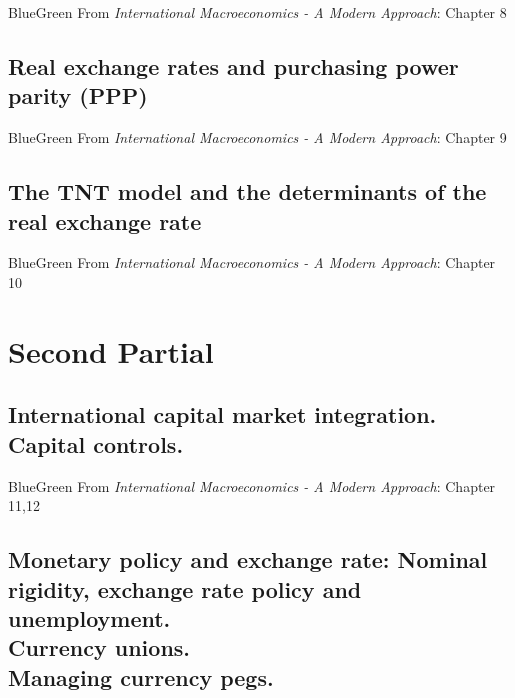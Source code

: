 \documentclass[usenames,dvipsnames,12pt]{book}
\begin{document}
        \begin{mybox}{BlueGreen}{}
            From \textit{International Macroeconomics - A Modern Approach}: Chapter 8
        \end{mybox}

    \chapter[Real exchange rates and purchasing power parity]{Real exchange rates and purchasing power parity (PPP)}

        \begin{mybox}{BlueGreen}{}
            From \textit{International Macroeconomics - A Modern Approach}: Chapter 9
        \end{mybox}

    \chapter[The TNT model]{The TNT model and the determinants of the real exchange rate}

        \begin{mybox}{BlueGreen}{}
            From \textit{International Macroeconomics - A Modern Approach}: Chapter 10
        \end{mybox}

\part{Second Partial}

    \chapter[Capital market integration and capital controls]{International capital market integration. \\ Capital controls.}

        \begin{mybox}{BlueGreen}{}
            From \textit{International Macroeconomics - A Modern Approach}: Chapter 11,12
        \end{mybox}

    \chapter[Monetary policy and exchange rate]{Monetary policy and exchange rate: Nominal rigidity, exchange rate policy and unemployment. \\ Currency unions. \\ Managing currency pegs.}
\end{document}

